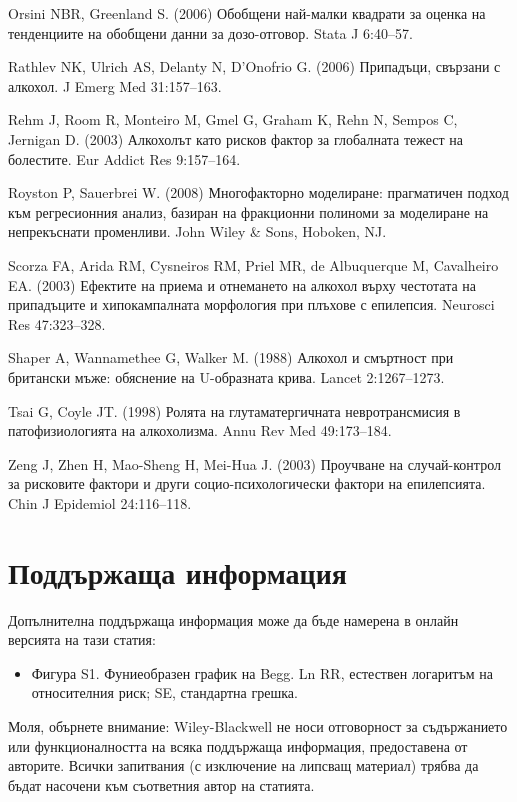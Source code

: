 \documentclass{article}
\begin{document}
Orsini NBR, Greenland S. (2006) Обобщени най-малки квадрати за оценка на тенденциите на обобщени данни за дозо-отговор. Stata J 6:40–57.

Rathlev NK, Ulrich AS, Delanty N, D’Onofrio G. (2006) Припадъци, свързани с алкохол. J Emerg Med 31:157–163.

Rehm J, Room R, Monteiro M, Gmel G, Graham K, Rehn N, Sempos C, Jernigan D. (2003) Алкохолът като рисков фактор за глобалната тежест на болестите. Eur Addict Res 9:157–164.

Royston P, Sauerbrei W. (2008) Многофакторно моделиране: прагматичен подход към регресионния анализ, базиран на фракционни полиноми за моделиране на непрекъснати променливи. John Wiley \& Sons, Hoboken, NJ.

Scorza FA, Arida RM, Cysneiros RM, Priel MR, de Albuquerque M, Cavalheiro EA. (2003) Ефектите на приема и отнемането на алкохол върху честотата на припадъците и хипокампалната морфология при плъхове с епилепсия. Neurosci Res 47:323–328.

Shaper A, Wannamethee G, Walker M. (1988) Алкохол и смъртност при британски мъже: обяснение на U-образната крива. Lancet 2:1267–1273.

Tsai G, Coyle JT. (1998) Ролята на глутаматергичната невротрансмисия в патофизиологията на алкохолизма. Annu Rev Med 49:173–184.

Zeng J, Zhen H, Mao-Sheng H, Mei-Hua J. (2003) Проучване на случай-контрол за рисковите фактори и други социо-психологически фактори на епилепсията. Chin J Epidemiol 24:116–118.

\section*{Поддържаща информация}
Допълнителна поддържаща информация може да бъде намерена в
онлайн версията на тази статия:
\begin{itemize}
  \item Фигура S1. Фуниеобразен график на Begg. Ln RR, естествен логаритъм
  на относителния риск; SE, стандартна грешка.
\end{itemize}
Моля, обърнете внимание: Wiley-Blackwell не носи отговорност за
съдържанието или функционалността на всяка поддържаща информация, предоставена от авторите. Всички запитвания (с изключение на липсващ материал) трябва да бъдат насочени към съответния автор на
статията.
\end{document}
